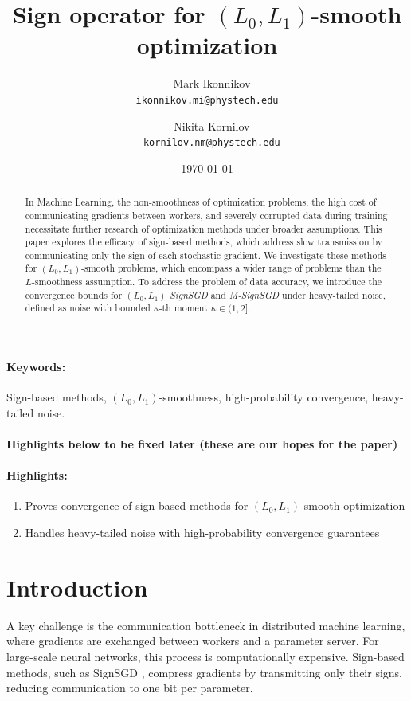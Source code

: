 \documentclass[12pt]{article}
\title{Sign operator for $(L_0, L_1)$-smooth optimization}
\author{
  Mark Ikonnikov\\
  \texttt{ikonnikov.mi@phystech.edu}
  \and
  Nikita Kornilov\\
  \texttt{kornilov.nm@phystech.edu}
}
\date{\today}
\begin{document}
\maketitle

\begin{abstract}
In Machine Learning, the non-smoothness of optimization problems, the high cost of communicating gradients between workers, and severely corrupted data during training necessitate further research of optimization methods under broader assumptions. This paper explores the efficacy of sign-based methods, which address slow transmission by communicating only the sign of each stochastic gradient. We investigate these methods for $(L_0, L_1)$-smooth problems, which encompass a wider range of problems than the $L$-smoothness assumption. To address the problem of data accuracy, we introduce the convergence bounds for \textit{$(L_0, L_1)$ SignSGD} and \textit{M-SignSGD} under heavy-tailed noise, defined as noise with bounded $\kappa$-th moment $\kappa \in (1,2]$.
\end{abstract}

\paragraph{Keywords:} Sign-based methods, $(L_0, L_1)$-smoothness, high-probability convergence, heavy-tailed noise.

\paragraph{ Highlights below to be fixed later (these are our hopes for the paper)}

\paragraph{ Highlights:}
\begin{enumerate}
\item Proves convergence of sign-based methods for $(L_0, L_1)$-smooth optimization
\item Handles heavy-tailed noise with high-probability convergence guarantees

\end{enumerate}

\section{Introduction}
A key challenge is the communication bottleneck in distributed machine learning, where gradients are exchanged between workers and a parameter server. For large-scale neural networks, this process is computationally expensive. Sign-based methods, such as SignSGD \cite{pmlr-v80-bernstein18a}, compress gradients by transmitting only their signs, reducing communication to one bit per parameter. 
\end{document}
